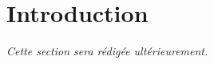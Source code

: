 \chapter{Introduction}
\label{chap:introduction}
\textit{Cette section sera rédigée ultérieurement.}
